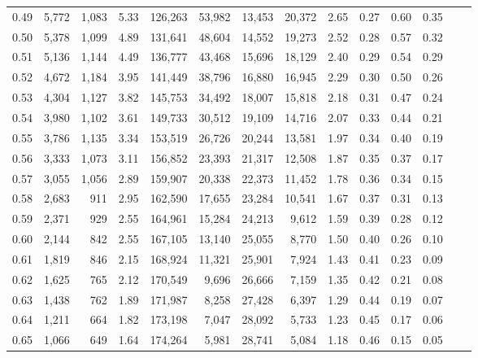 \begin{tabular}{rrrrrrrrrrrrrr}
0.49 &  5,772 &  1,083 &    5.33 &  126,263 &   53,982 &  13,453 &  20,372 &  2.65 &  0.27 &  0.60 &      0.35 \\
0.50 &  5,378 &  1,099 &    4.89 &  131,641 &   48,604 &  14,552 &  19,273 &  2.52 &  0.28 &  0.57 &      0.32 \\
0.51 &  5,136 &  1,144 &    4.49 &  136,777 &   43,468 &  15,696 &  18,129 &  2.40 &  0.29 &  0.54 &      0.29 \\
0.52 &  4,672 &  1,184 &    3.95 &  141,449 &   38,796 &  16,880 &  16,945 &  2.29 &  0.30 &  0.50 &      0.26 \\
0.53 &  4,304 &  1,127 &    3.82 &  145,753 &   34,492 &  18,007 &  15,818 &  2.18 &  0.31 &  0.47 &      0.24 \\
0.54 &  3,980 &  1,102 &    3.61 &  149,733 &   30,512 &  19,109 &  14,716 &  2.07 &  0.33 &  0.44 &      0.21 \\
0.55 &  3,786 &  1,135 &    3.34 &  153,519 &   26,726 &  20,244 &  13,581 &  1.97 &  0.34 &  0.40 &      0.19 \\
0.56 &  3,333 &  1,073 &    3.11 &  156,852 &   23,393 &  21,317 &  12,508 &  1.87 &  0.35 &  0.37 &      0.17 \\
0.57 &  3,055 &  1,056 &    2.89 &  159,907 &   20,338 &  22,373 &  11,452 &  1.78 &  0.36 &  0.34 &      0.15 \\
0.58 &  2,683 &    911 &    2.95 &  162,590 &   17,655 &  23,284 &  10,541 &  1.67 &  0.37 &  0.31 &      0.13 \\
0.59 &  2,371 &    929 &    2.55 &  164,961 &   15,284 &  24,213 &   9,612 &  1.59 &  0.39 &  0.28 &      0.12 \\
0.60 &  2,144 &    842 &    2.55 &  167,105 &   13,140 &  25,055 &   8,770 &  1.50 &  0.40 &  0.26 &      0.10 \\
0.61 &  1,819 &    846 &    2.15 &  168,924 &   11,321 &  25,901 &   7,924 &  1.43 &  0.41 &  0.23 &      0.09 \\
0.62 &  1,625 &    765 &    2.12 &  170,549 &    9,696 &  26,666 &   7,159 &  1.35 &  0.42 &  0.21 &      0.08 \\
0.63 &  1,438 &    762 &    1.89 &  171,987 &    8,258 &  27,428 &   6,397 &  1.29 &  0.44 &  0.19 &      0.07 \\
0.64 &  1,211 &    664 &    1.82 &  173,198 &    7,047 &  28,092 &   5,733 &  1.23 &  0.45 &  0.17 &      0.06 \\
0.65 &  1,066 &    649 &    1.64 &  174,264 &    5,981 &  28,741 &   5,084 &  1.18 &  0.46 &  0.15 &      0.05 \\

\end{tabular}
